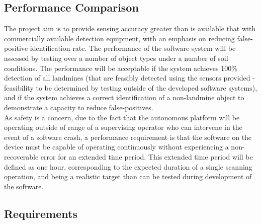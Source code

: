 \documentclass[main.tex]{subfiles}
\begin{document}
\begin{appendices}
\subsection{Performance Comparison}
The project aim is to provide sensing accuracy greater than is available that with commercially available detection equipment, with an emphasis on reducing false-positive identification rate. The performance of the software system will be assessed by testing over a number of object types under a number of soil conditions. The performance will be acceptable if the system achieves 100\% detection of all landmines (that are feasibly detected using the sensors provided - feasibility to be determined by testing outside of the developed software systems), and if the system achieves a correct identification of a non-landmine object to demonstrate a capacity to reduce false-positives.\\
As safety is a concern, due to the fact that the autonomous platform will be operating outside of range of a supervising operator who can intervene in the event of a software crash, a performance requirement is that the software on the device must be capable of operating continuously without experiencing a non-recoverable error for an extended time period. This extended time period will be defined as one hour, corresponding to the expected duration of a single scanning operation, and being a realistic target than can be tested during development of the software.

\subsection{Requirements}
 

\end{appendices}
\end{document}
